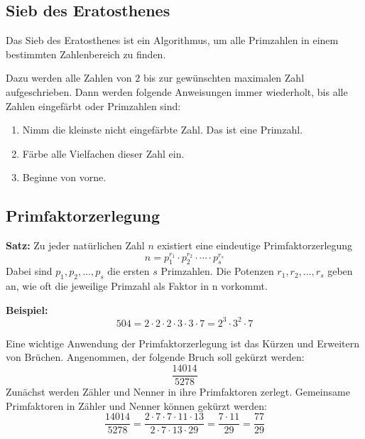 \subsection{Sieb des Eratosthenes}

Das Sieb des Eratosthenes ist ein Algorithmus, um alle Primzahlen in einem bestimmten Zahlenbereich zu finden.

Dazu werden alle Zahlen von $2$ bis zur gewünschten maximalen Zahl aufgeschrieben. Dann werden folgende Anweisungen immer wiederholt, bis alle Zahlen eingefärbt oder Primzahlen sind:
\begin{enumerate}
  \item Nimm die kleinste nicht eingefärbte Zahl. Das ist eine Primzahl.
  \item Färbe alle Vielfachen dieser Zahl ein.
  \item Beginne von vorne.
\end{enumerate}

\newpage
\subsection{Primfaktorzerlegung}

\begin{theorem}
  \textbf{Satz:} Zu jeder natürlichen Zahl $n$ existiert eine eindeutige Primfaktorzerlegung
  \[
    n = p_{1}^{r_{1}} \cdot p_{2}^{r_{2}} \cdot \cdots \cdot p_{s}^{r_{s}}
  \]
  Dabei sind $p_{1}, p_{2}, \ldots, p_{s}$ die ersten $s$ Primzahlen. Die Potenzen $r_{1}, r_{2},\ldots, r_{s}$ geben an, wie oft die jeweilige Primzahl als Faktor in n vorkommt.
\end{theorem}

\begin{example}
  \textbf{Beispiel:}
  \[
    504 = 2\cdot 2\cdot 2\cdot 3\cdot 3\cdot 7 = 2^{3}\cdot 3^{2}\cdot 7
  \]
\end{example}

Eine wichtige Anwendung der Primfaktorzerlegung ist das Kürzen und Erweitern von Brüchen. Angenommen, der folgende Bruch soll gekürzt werden:
\[
  \frac{14014}{5278}
\]
Zunächst werden Zähler und Nenner in ihre Primfaktoren zerlegt. Gemeinsame Primfaktoren in Zähler und Nenner können gekürzt werden:
\[
  \frac{14014}{5278} = \frac{2\cdot 7\cdot 7\cdot 11\cdot 13}{2\cdot 7\cdot 13\cdot 29} = \frac{7\cdot 11}{29} = \frac{77}{29}
\]

